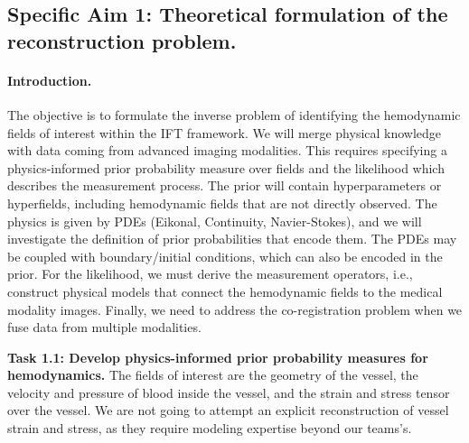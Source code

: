 \subsection*{Specific Aim 1: Theoretical formulation of the reconstruction problem.}
\paragraph{Introduction.}
The objective is to formulate the inverse problem of identifying the hemodynamic fields of interest within the IFT framework. We will merge physical knowledge with data coming from advanced imaging modalities. This requires specifying a physics-informed prior probability measure over fields and the likelihood which describes the measurement process. The prior will contain hyperparameters or hyperfields, including hemodynamic fields that are not directly observed. The physics is given by PDEs (Eikonal, Continuity, Navier-Stokes), and we will investigate the definition of prior probabilities that encode them. The PDEs may be coupled with boundary/initial conditions, which can also be encoded in the prior. For the likelihood, we must derive the measurement operators, i.e., construct physical models that connect the hemodynamic fields to the medical modality images.
Finally, we need to address the co-registration problem when we fuse data from multiple modalities.

\textbf{Task 1.1: Develop physics-informed prior probability measures for hemodynamics.}
The fields of interest are the geometry of the vessel, the velocity and pressure of blood inside the vessel, and the strain and stress tensor over the vessel.
We are not going to attempt an explicit reconstruction of vessel strain and stress, as they require modeling expertise beyond our teams's.

